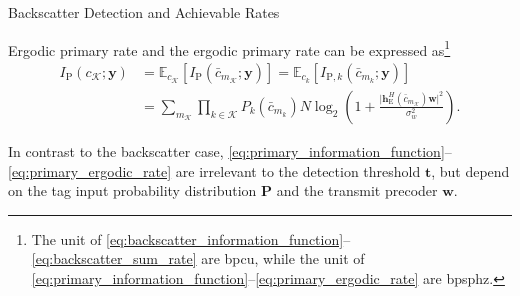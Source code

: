\documentclass[journal]{IEEEtran}
\begin{document}
\begin{section}{Backscatter Detection and Achievable Rates}
\begin{subsection}{Ergodic primary rate}
			and the ergodic primary rate can be expressed as\footnote{The unit of \eqref{eq:backscatter_information_function}--\eqref{eq:backscatter_sum_rate} are \gls{bpcu}, while the unit of \eqref{eq:primary_information_function}--\eqref{eq:primary_ergodic_rate} are \gls{bpsphz}.}
			\begin{subequations}
				\begin{align}
					I_{\mathrm{P}}(c_{\mathcal{K}};\boldsymbol{y})
					& = \mathbb{E}_{c_{\mathcal{K}}} \left[I_{\mathrm{P}}(\bar{c}_{m_{\mathcal{K}}};\boldsymbol{y})\right] = \mathbb{E}_{c_k} \left[I_{\mathrm{P},k}(\bar{c}_{m_k};\boldsymbol{y})\right]\label{eq:primary_ergodic_rate_expectation}\\
					& = \sum_{m_{\mathcal{K}}} \prod_{k \in \mathcal{K}} P_k(\bar{c}_{m_k}) N \log_2 \left(1 + \frac{\lvert \boldsymbol{h}_{\mathrm{E}}^H(\bar{c}_{m_{\mathcal{K}}}) \boldsymbol{w} \rvert^2}{\sigma_w^2}\right).
					\label{eq:primary_ergodic_rate_expansion}
				\end{align}
				\label{eq:primary_ergodic_rate}
			\end{subequations}

			In contrast to the backscatter case, \eqref{eq:primary_information_function}--\eqref{eq:primary_ergodic_rate} are irrelevant to the detection threshold $\boldsymbol{t}$, but depend on the tag input probability distribution $\boldsymbol{P}$ and the transmit precoder $\boldsymbol{w}$.
		\end{subsection}
	\end{section}
\end{document}
